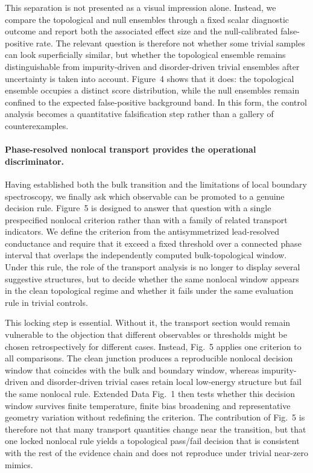 This separation is not presented as a visual impression alone. Instead, we compare the topological and null ensembles through a fixed scalar diagnostic outcome and report both the associated effect size and the null-calibrated false-positive rate. The relevant question is therefore not whether some trivial samples can look superficially similar, but whether the topological ensemble remains distinguishable from impurity-driven and disorder-driven trivial ensembles after uncertainty is taken into account. Figure~4 shows that it does: the topological ensemble occupies a distinct score distribution, while the null ensembles remain confined to the expected false-positive background band. In this form, the control analysis becomes a quantitative falsification step rather than a gallery of counterexamples.

\paragraph{Phase-resolved nonlocal transport provides the operational discriminator.}
Having established both the bulk transition and the limitations of local boundary spectroscopy, we finally ask which observable can be promoted to a genuine decision rule. Figure~5 is designed to answer that question with a single prespecified nonlocal criterion rather than with a family of related transport indicators. We define the criterion from the antisymmetrized lead-resolved conductance and require that it exceed a fixed threshold over a connected phase interval that overlaps the independently computed bulk-topological window. Under this rule, the role of the transport analysis is no longer to display several suggestive structures, but to decide whether the same nonlocal window appears in the clean topological regime and whether it fails under the same evaluation rule in trivial controls.

This locking step is essential. Without it, the transport section would remain vulnerable to the objection that different observables or thresholds might be chosen retrospectively for different cases. Instead, Fig.~5 applies one criterion to all comparisons. The clean junction produces a reproducible nonlocal decision window that coincides with the bulk and boundary window, whereas impurity-driven and disorder-driven trivial cases retain local low-energy structure but fail the same nonlocal rule. Extended Data Fig.~1 then tests whether this decision window survives finite temperature, finite bias broadening and representative geometry variation without redefining the criterion. The contribution of Fig.~5 is therefore not that many transport quantities change near the transition, but that one locked nonlocal rule yields a topological pass/fail decision that is consistent with the rest of the evidence chain and does not reproduce under trivial near-zero mimics.

